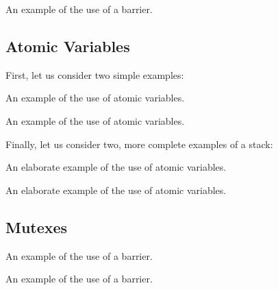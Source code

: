 \begin{itemize}
\begin{end}
\raggedbottom
\begin{codebox}[]{\href{https://godbolt.org/z/}{\ExternalLink}}
\footnotesize An example of the use of a barrier.
\tcblower
{}
\end{codebox}

\subsection{Atomic Variables}

First, let us consider two simple examples:

\raggedbottom
\begin{codebox}[]{\href{https://godbolt.org/z/}{\ExternalLink}}
\footnotesize An example of the use of atomic variables.
\tcblower
{}
\end{codebox}

\raggedbottom
\begin{codebox}[]{\href{https://godbolt.org/z/}{\ExternalLink}}
\footnotesize An example of the use of atomic variables.
\tcblower
{}
\end{codebox}

Finally, let us consider two, more complete examples of a stack:

\raggedbottom
\begin{codebox}[]{\href{https://godbolt.org/z/}{\ExternalLink}}
\footnotesize An elaborate example of the use of atomic variables.
\tcblower
{}
\end{codebox}

\raggedbottom
\begin{codebox}[]{\href{https://godbolt.org/z/}{\ExternalLink}}
\footnotesize An elaborate example of the use of atomic variables.
\tcblower
{}
\end{codebox}

\subsection{Mutexes}

\raggedbottom
\begin{codebox}[]{\href{https://godbolt.org/z/}{\ExternalLink}}
\footnotesize An example of the use of a barrier.
\tcblower
{}
\end{codebox}

\raggedbottom
\begin{codebox}[]{\href{https://godbolt.org/z/}{\ExternalLink}}
\footnotesize An example of the use of a barrier.
\tcblower
{}
\end{codebox}


\end{end}
\end{itemize}
